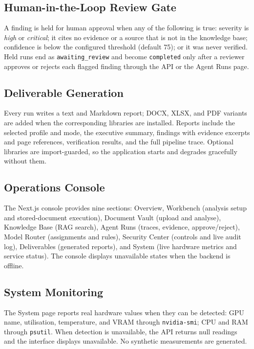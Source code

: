 \documentclass[11pt,a4paper]{article}
\begin{document}
\subsection{Human-in-the-Loop Review Gate}
A finding is held for human approval when any of the following is true:
severity is \emph{high} or \emph{critical}; it cites no evidence or a source
that is not in the knowledge base; confidence is below the configured
threshold (default 75); or it was never verified. Held runs end as
\texttt{awaiting\_review} and become \texttt{completed} only after a reviewer
approves or rejects each flagged finding through the API or the Agent Runs
page.

\subsection{Deliverable Generation}
Every run writes a text and Markdown report; DOCX, XLSX, and PDF variants are
added when the corresponding libraries are installed. Reports include the
selected profile and mode, the executive summary, findings with evidence
excerpts and page references, verification results, and the full pipeline
trace. Optional libraries are import-guarded, so the application starts and
degrades gracefully without them.

\subsection{Operations Console}
The Next.js console provides nine sections:
Overview, Workbench (analysis setup and stored-document execution), Document Vault
(upload and analyse), Knowledge Base (RAG search), Agent Runs (traces,
evidence, approve/reject), Model Router (assignments and rules), Security
Center (controls and live audit log), Deliverables (generated reports), and
System (live hardware metrics and service status). The console displays unavailable states when the backend is offline.

\subsection{System Monitoring}
The System page reports real hardware values when they can be detected: GPU
name, utilisation, temperature, and VRAM through \texttt{nvidia-smi}; CPU and
RAM through \texttt{psutil}. When detection is unavailable, the API returns null readings and the interface displays unavailable. No synthetic measurements are generated.

\end{document}
